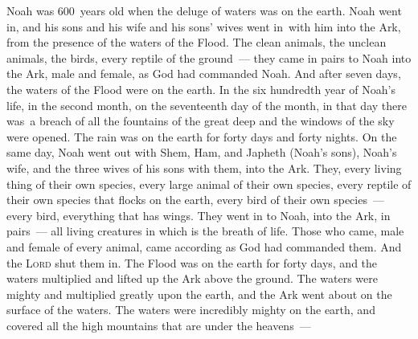 \begin{inparaenum}
   Noah was 600~years old when the deluge of waters was on the earth.%
   Noah went in, and his sons and his wife and his sons' wives went in\understood\ with him into the Ark, from the presence of the waters of the Flood.%
   The clean animals, the unclean animals, the birds, every reptile of the ground~---%
   they came in pairs to Noah into the Ark, male and female, as God had commanded Noah.%
   And after seven days, the waters of the Flood were on the earth.%
   In the six hundredth year of Noah's life, in the second month, on the seventeenth day of the month, in that day there was\understood\ a breach of all the fountains of the great deep and the windows of the sky were opened.%
   The rain was on the earth for forty days and forty nights.%
   On the same day, Noah went out with Shem, Ham, and Japheth (Noah's sons), Noah's wife, and the three wives of his sons with them, into the Ark.%
   They, every living thing of their own species, every large animal of their own species, every reptile of their own species that flocks on the earth, every bird of their own species~--- every bird, everything that has wings.%
   They went in to Noah, into the Ark, in pairs~--- all living creatures in which is the breath of life.%
   Those who came, male and female of every animal, came according as God had commanded them. And the \textsc{Lord} shut them in.%
   The Flood was on the earth for forty days, and the waters multiplied and lifted up the Ark above the ground.%
   The waters were mighty and multiplied greatly upon the earth, and the Ark went about on the surface of the waters.%
   The waters were incredibly mighty on the earth, and covered all the high mountains that are under the heavens~---%

\end{inparaenum}
